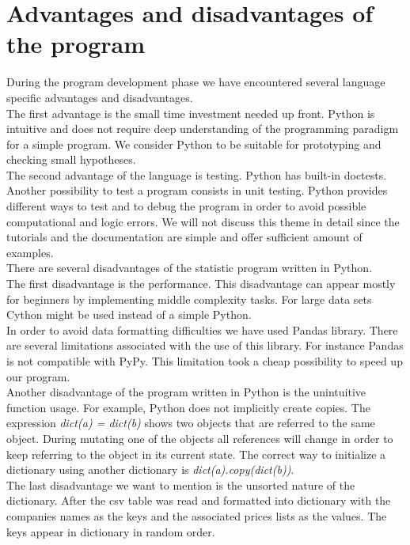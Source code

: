 \documentclass[
  twoside,
  11pt, a4paper,
  footinclude=true,
  headinclude=true,
  cleardoublepage=empty
]{scrreprt}
\begin{document}
    \section{Advantages and disadvantages of the program}
    During the program development phase we have encountered several language specific advantages and disadvantages.\\
    The first advantage is the small time investment needed up front. Python is intuitive and does not require deep understanding of the programming paradigm for a simple program. We consider Python to be suitable for prototyping and checking small hypotheses.\\
    The second advantage of the language is testing. Python has built-in doctests. Another possibility to test a program consists in unit testing. Python provides different ways to test and to debug the program in order to avoid possible computational and logic errors. We will not discuss this theme in detail since the tutorials and the documentation are simple and offer sufficient amount of examples.\\
    There are several disadvantages of the statistic program written in Python.\\ 
    The first disadvantage is the performance. This disadvantage can appear mostly for beginners by implementing middle complexity tasks. For large data sets Cython might be used instead of a simple Python.\\
    In order to avoid data formatting difficulties we have used Pandas library. There are several limitations associated with the use of this library. For instance Pandas is not compatible with PyPy. This limitation took a cheap possibility to speed up our program.\\
    Another disadvantage of the program written in Python is the unintuitive function usage. For example, Python does not implicitly create copies. The expression \textit{dict(a) = dict(b)} shows two objects that are referred to the same object. During mutating one of the objects all references will change in order to keep referring to the object in its current state. The correct way to initialize a dictionary using another dictionary is \textit{dict(a).copy(dict(b))}. \\
    The last disadvantage we want to mention is the unsorted nature of the dictionary. After the csv table was read and formatted into dictionary with the companies names as the keys and the associated prices lists as the values. The keys appear in dictionary in random order.
    
\end{document}
